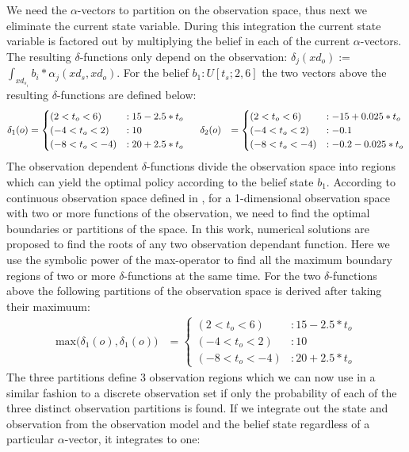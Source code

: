 \documentclass{article} %
\begin{document}
We need the $\alpha$-vectors to partition on the observation space, thus next we eliminate the current state variable. During this integration the current state variable is factored out by multiplying the belief in each of the current $\alpha$-vectors.  The resulting $\delta$-functions only depend on the observation: $\delta_{j}(xd_o) := $ $\int_{xd_{s_i}} b_i * \alpha_j(xd_s,xd_o)$.
For the belief $b_1: U[t_s;2,6]$ the two vectors above the resulting $\delta$-functions are defined below: 
{\footnotesize
\begin{align}
\delta_{1}(o) &= 
\begin{cases}
 (2<t_o<6) &: 15 - 2.5*t_o \\
(-4<t_o<2) &: 10 \\
(-8<t_o<-4) &: 20 + 2.5*t_o 
\end{cases}
\hspace{5mm} 
\delta_{2}(o) &= \begin{cases}
 (2<t_o<6) &: -15 + 0.025*t_o \\
(-4<t_o<2) &: -0.1 \\
(-8<t_o<-4) &: -0.2 - 0.025*t_o 
\end{cases}
\nonumber
\end{align}
}
The observation dependent $\delta$-functions divide the observation space into regions which can yield the optimal policy according to the belief state $b_1$. According to continuous observation space defined in \cite{pascalPomdp}, for a 1-dimensional observation space with two or more functions of the observation, we need to find the optimal boundaries or partitions of the space. In this work, numerical solutions are proposed to find the roots of any two observation dependant function. Here we use the symbolic power of the max-operator to find all the maximum boundary regions of two or more $\delta$-functions at the same time. For the two $\delta$-functions above the following partitions of the observation space is derived after taking their maximuum: 
{\footnotesize
\begin{align}
\mathrm{max} \Bigg(\delta_{1}(o),\delta_{1}(o)\Bigg) &= 
\begin{cases}
 (2<t_o<6) &: 15 - 2.5*t_o \\
(-4<t_o<2) &: 10 \\
(-8<t_o<-4) &: 20 + 2.5*t_o 
\end{cases}
\nonumber
\end{align}
}
The three partitions define 3 observation regions which we can now use in a similar fashion to a discrete observation set if only the probability of each of the three distinct observation partitions is found. If we integrate out the state and observation from the observation model and the belief state regardless of a particular $\alpha$-vector, it integrates to one: 
\end{document}
